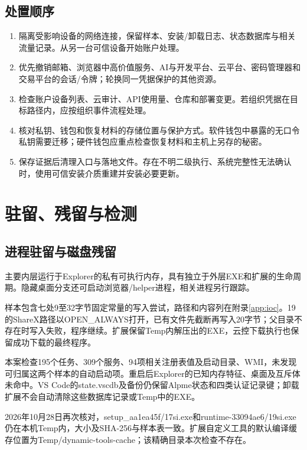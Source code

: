 \documentclass[UTF8,a4paper,zihao=5,fontset=windows]{ctexart}
\newcommand{\code}[1]{{\ttfamily\small #1}}
\begin{document}
\subsection{处置顺序}
\begin{enumerate}
\item 隔离受影响设备的网络连接，保留样本、安装/卸载日志、状态数据库与相关流量记录。从另一台可信设备开始账户处理。
\item 优先撤销邮箱、浏览器中高价值服务、AI与开发平台、云平台、密码管理器和交易平台的会话/令牌；轮换同一凭据保护的其他资源。
\item 检查账户设备列表、云审计、API使用量、仓库和部署变更。若组织凭据在目标路径内，应按组织事件流程处理。
\item 核对私钥、钱包和恢复材料的存储位置与保护方式。软件钱包中暴露的无口令私钥需要迁移；硬件钱包应重点检查恢复材料和主机上另存的秘密。
\item 保存证据后清理入口与落地文件。存在不明二级执行、系统完整性无法确认时，使用可信安装介质重建并安装必要更新。\cite{windowsrecovery}
\end{enumerate}

\section{驻留、残留与检测}
\label{sec:residue}
\subsection{进程驻留与磁盘残留}
主要内层运行于Explorer的私有可执行内存，具有独立于外层EXE和扩展的生命周期。隐藏桌面分支还可启动浏览器/helper进程，相关进程另行跟踪。

样本包含七处9至32字节固定常量的写入尝试，路径和内容列在附录\ref{app:ioc}。19的ShareX路径以OPEN\_ALWAYS打开，已有文件先截断再写入20字节；父目录不存在时写入失败，程序继续。扩展保留Temp内解压出的EXE，云控下载执行也保留成功下载的最终程序。

本案检查195个任务、309个服务、94项相关注册表值及启动目录、WMI，未发现可归属这两个样本的自动启动项。重启后Explorer的已知内存特征、桌面及互斥体未命中。VS Code的state.vscdb及备份仍保留Alpme状态和四类认证记录键；卸载扩展不会自动清除这些数据库记录或Temp中的EXE。

2026年10月28日再次核对，\code{setup\_aa1ea45f/17si.exe}和\code{runtime-33094ae6/19si.exe}仍在本机Temp内，大小及SHA-256与样本表一致。扩展自定义工具的默认编译缓存位置为\code{Temp/dynamic-tools-cache}；该精确目录本次检查不存在。
\end{document}
